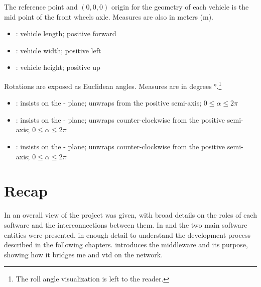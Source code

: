The reference point and $(0,0,0)$ origin for the geometry of each vehicle is the mid point of the front wheels axle. Measures are also in meters (\si{\meter}).

\begin{itemize}
	\item {}: vehicle length; positive forward
	\item {}: vehicle width; positive left
	\item {}: vehicle height; positive up
\end{itemize}

Rotations are exposed as Euclidean angles. Measures are in degrees \si{\degree}.\footnote{The roll angle visualization is left to the reader.}

\begin{itemize}
	\item {}: insists on the - plane; unwraps from the positive  semi-axis; $0 \leqslant \alpha \leqslant 2\pi$
	\item {}: insists on the - plane; unwraps counter-clockwise from the positive  semi-axis; $0 \leqslant \alpha \leqslant 2\pi$
	\item {}: insists on the - plane; unwraps counter-clockwise from the positive  semi-axis; $0 \leqslant \alpha \leqslant 2\pi$
\end{itemize}

\section{Recap}\label{sc:software:recap}

In  an overall view of the project was given, with broad details on the roles of each software and the interconnections between them. In  and  the two main software entities were presented, in enough detail to understand the development process described in the following chapters.  introduces the \gls{middleware} and its purpose, showing how it bridges \gls{me} and \gls{vtd} on the network.
